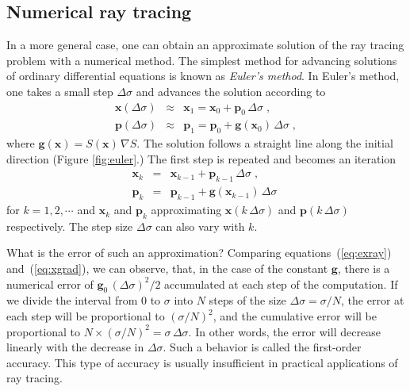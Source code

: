 \documentclass[12pt]{handout}
\begin{document}

\subsection{Numerical ray tracing}

In a more general case, one can obtain an approximate solution of the
ray tracing problem with a numerical method. The simplest method for
advancing solutions of ordinary differential equations is known as
\emph{Euler's method}. In Euler's method, one takes a small step
$\Delta \sigma$ and advances the solution according to
\begin{eqnarray}
  \label{eq:exray}
  \mathbf{x}(\Delta \sigma) & \approx & 
  \mathbf{x}_1 = \mathbf{x}_0 + \mathbf{p}_0\,\Delta \sigma\;, \\
  \label{eq:epray}
  \mathbf{p}(\Delta \sigma) & \approx &
  \mathbf{p}_1 = \mathbf{p}_0 + \mathbf{g}(\mathbf{x}_0)\,\Delta \sigma\;,
\end{eqnarray}
where $\mathbf{g}(\mathbf{x}) = S(\mathbf{x})\,\nabla S$.  The solution
follows a straight line along the initial direction (Figure \ref{fig:euler}.)
The first step is repeated and becomes an iteration
\begin{eqnarray}
  \label{eq:exrayk}
  \mathbf{x}_k & = & \mathbf{x}_{k-1} + \mathbf{p}_{k-1}\,\Delta \sigma\;, \\
  \label{eq:eprayk}
  \mathbf{p}_k & = & \mathbf{p}_{k-1} + \mathbf{g}(\mathbf{x}_{k-1})\,\Delta \sigma\;
\end{eqnarray}
for $k=1,2,\cdots$ and $\mathbf{x}_k$ and $\mathbf{p}_k$ approximating
$\mathbf{x}(k\,\Delta \sigma)$ and $\mathbf{p}(k\,\Delta \sigma)$
respectively. The step size $\Delta \sigma$ can also vary with $k$.


What is the error of such an approximation? Comparing
equations~(\ref{eq:exray}) and~(\ref{eq:xgrad}), we can observe, that,
in the case of the constant $\mathbf{g}$, there is a numerical error
of $\mathbf{g}_0\,(\Delta \sigma)^2/2$ accumulated at each step of the
computation. If we divide the interval from $0$ to $\sigma$ into $N$
steps of the size $\Delta \sigma = \sigma/N$, the error at each step
will be proportional to $(\sigma/N)^2$, and the cumulative error will
be proportional to $N \times (\sigma/N)^2 = \sigma\,\Delta \sigma$. In
other words, the error will decrease linearly with the decrease in
$\Delta \sigma$. Such a behavior is called the first-order
accuracy. This type of accuracy is usually insufficient in
practical applications of ray tracing.
\end{document}
